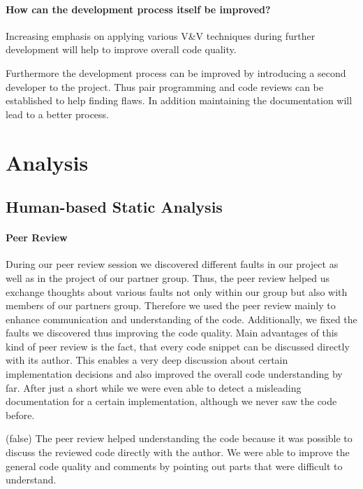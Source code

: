 \documentclass{scrartcl}
\begin{document}
\paragraph{How can the development process itself be improved?}

Increasing emphasis on applying various V\&V techniques during further development will help to improve overall code quality. 

Furthermore the development process can be improved by introducing a second developer to the project. Thus pair programming and code reviews can be established to help finding flaws. In addition maintaining the documentation will lead to a better process.


\section{Analysis}

\subsection{Human-based Static Analysis}

\paragraph{Peer Review}

During our peer review session we discovered different faults in our project as well as in the project of our partner group. Thus, the peer review helped us exchange thoughts about various faults not only within our group but also with members of our partners group. Therefore we used the peer review mainly to enhance communication and understanding of the code. Additionally, we fixed the faults we discovered thus improving the code quality. Main advantages of this kind of peer review is the fact, that every code snippet can be discussed directly with its author. This enables a very deep discussion about certain implementation decisions and also improved the overall code understanding by far. After just a short while we were even able to detect a misleading documentation for a certain implementation, although we never saw the code before. 

\if(false) 
The peer review helped understanding the code because it was possible to discuss the reviewed code directly with the author.
We were able to improve the general code quality and comments by pointing out parts that were difficult to understand.
\end{document}

